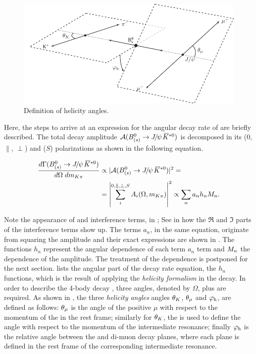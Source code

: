 \begin{figure}[t]
  \centering
  \includegraphics[width=\textwidth]{Figures/Chapter4/helAngles}
  \caption{Definition of helicity angles.}
  \label{helAngles}
\end{figure}

Here, the steps to arrive at an expression for the angular decay rate of \BsJpsiKst are briefly described.
The total decay amplitude $\mathcal{A}(\text{\BJpsiKst})$ is decomposed in its \pwave ($0$, $\parallel$, $\perp$)
and \swave ($S$) polarizations as shown in the following equation.

\begin{align}
  \centering
  \frac{d\Gamma(\text{\BJpsiKst})}{d\Omega\;d\mkpi} &\propto |\mathcal{A}(\text{\BJpsiKst})|^2 = \nonumber \\
                                                    &= \left| \sum_i^{0,\parallel,\perp,S} A_i(\Omega,\mkpi) \right|^2  \propto \sum_n a_n h_n \mKpiAmp.
  \label{ang_terms}
\end{align}

\noindent Note the appearance of \pwave and \spwave interference terms, in ; See in \cite{jeroenThesis} how the $\Re$
and $\Im$ parts of the interference terms show up. The terms $a_n$, in the same equation,
originate from squaring the amplitude and their exact expressions are shown in .
The functions $h_n$ represent the angular dependence of each term $a_n$ term and $M_{n}$ the \mkpi dependence of
the amplitude. The treatment of the \mkpi dependence is postponed for the next section.  lists the angular
part of the decay rate equation, \ie the $h_n$ functions, which is the result of
applying the \emph{helicity formalism} in the \BJpsiKst decay. In order to describe the 4-body decay \BJpsiKst, three
angles, denoted by $\Omega$, plus \mkpi are required. As shown in , the three \emph{helicity angles} angles
$\theta_{K}$, $\theta_{\mu}$ and ${\varphi_{\text h}}$, are defined as follows: $\theta_{\mu}$ is the angle of the positive $\mu$ with respect to the
momentum of the \jpsi in the \Bs rest frame; similarly for $\theta_{K}$, the \kaon is used to define the angle with respect to
the momentum of the intermediate \Kpi resonance; finally ${\varphi_{\text h}}$ is the relative angle between the \Kpi and di-muon decay
planes, where each plane is defined in the rest frame of the corresponding intermediate resonance.

